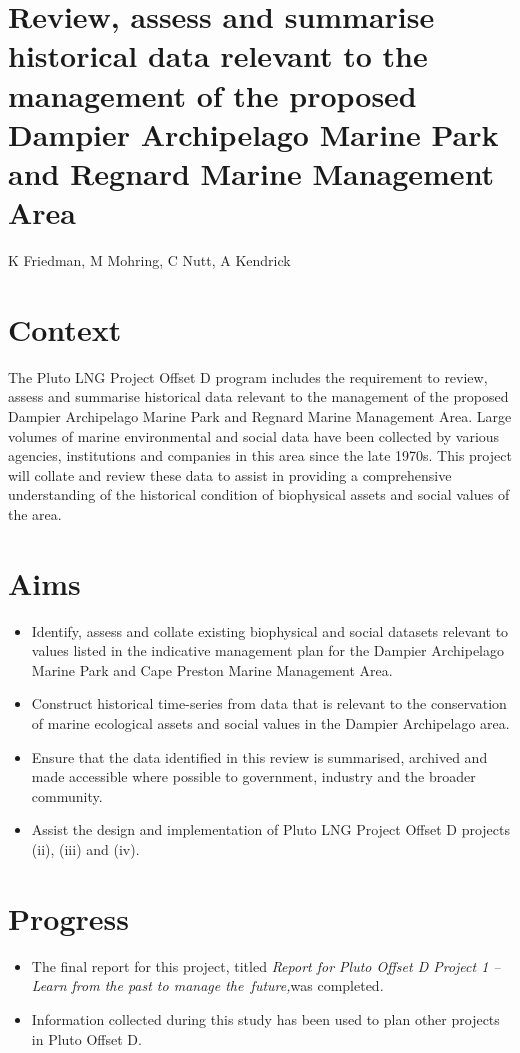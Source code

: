 \documentclass[version=last,
    paper=a4, %
    10pt, %
    usenames,
    dvipsnames,
    oneside, %
    headings=openany, %
    DIV=15 %
]{scrbook}
\begin{document}
\section*{Review, assess and summarise historical data relevant to the management
of the proposed Dampier Archipelago Marine Park and Regnard Marine
Management Area
}

K Friedman, M Mohring, C Nutt, A Kendrick


\section*{Context}
The Pluto LNG Project Offset D program includes the requirement to
review, assess and summarise historical data relevant to the management
of the proposed Dampier Archipelago Marine Park and Regnard Marine
Management Area. Large volumes of marine environmental and social data
have been collected by various agencies, institutions and companies in
this area since the late 1970s. This project will collate and review
these data to assist in providing a comprehensive understanding of the
historical condition of biophysical assets and social values of the
area.



\section*{Aims}
\begin{itemize}
\itemsep1pt\parskip0pt
\item
  Identify, assess and collate existing biophysical and social datasets
  relevant to values listed in the indicative management plan for the
  Dampier Archipelago Marine Park and Cape Preston Marine Management
  Area.
\item
  Construct historical time-series from data that is relevant to the
  conservation of marine ecological assets and social values in the
  Dampier Archipelago area.
\item
  Ensure that the data identified in this review is summarised, archived
  and made accessible where possible to government, industry and the
  broader community.
\item
  Assist the design and implementation of Pluto LNG Project Offset D
  projects (ii), (iii) and (iv).
\end{itemize}



\section*{Progress}
\begin{itemize}
\itemsep1pt\parskip0pt
\item
  The final report for this project, titled \emph{Report for Pluto
  Offset D Project 1 --Learn from the past to manage the~future,}was
  completed.
\item
  Information collected during this study has been used to plan other
  projects in Pluto Offset D.
\end{itemize}
\end{document}
